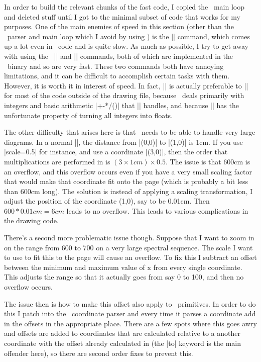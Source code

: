 In order to build the relevant chunks of the fast code, I copied the \tikzname\ main loop and deleted stuff until I got to the minimal subset of code that works for my purposes.
One of the main enemies of speed in this section (other than the \tikzname\ parser and main loop which I avoid by using \pgfpkg) is the |\pgfmathparse| command, which comes up a lot even in \pgfpkg\ code and is quite slow. As much as possible, I try to get away with using the \eTeX\ |\numexpr| and |\dimexpr| commands, both of which are implemented in the \eTeX\ binary and so are very fast. These two commands both have annoying limitations, and it can be difficult to accomplish certain tasks with them. However, it is worth it in interest of speed. In fact, |\numexpr| is actually preferable to |\pgfmathparse| for most of the code outside of the drawing file, because \sseqpages\ deals primarily with integers and basic arithmetic |+-*/()| that |\numexpr| handles, and because |\pgfmathparse| has the unfortunate property of turning all integers into floats.

The other difficulty that arises here is that \spectralsequences\ needs to be able to handle very large diagrams. In a normal |\tikzpicture|, the distance from |(0,0)| to |(1,0)| is 1cm. If you use |scale=0.5| for instance, and use a coordinate |(3,0)|, then the order that multiplications are performed in is $(3\times 1cm)\times 0.5$. The issue is that 600cm is an overflow, and this overflow occurs even if you have a very small scaling factor that would make that coordinate fit onto the page (which is probably a bit less than 600cm long). The solution is instead of applying a scaling transformation, I adjust the position of the coordinate (1,0), say to be 0.01cm. Then $600*0.01cm= 6cm$ leads to no overflow. This leads to various complications in the drawing code.

There's a second more problematic issue though. Suppose that I want to zoom in on the range from 600 to 700 on a very large spectral sequence. The scale I want to use to fit this to the page will cause an overflow. To fix this I subtract an offset between the minimum and maximum value of x from every single coordinate. This adjusts the range so that it actually goes from say 0 to 100, and then no overflow occurs.

The issue then is how to make this offset also apply to \tikzname\ primitives. In order to do this I patch into the \tikzname\ coordinate parser and every time it parses a coordinate add in the offsets in the appropriate place. There are a few spots where this goes awry and offsets are added to coordinates that are calculated relative to a another coordinate with the offset already calculated in (the |to| keyword is the main offender here), so there are second order fixes to prevent this.


 